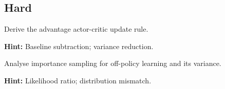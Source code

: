 \subsection*{Hard}

\begin{problem}
Derive the advantage actor-critic update rule.

\textbf{Hint:} Baseline subtraction; variance reduction.
\end{problem}

\begin{problem}
Analyse importance sampling for off-policy learning and its variance.

\textbf{Hint:} Likelihood ratio; distribution mismatch.
\end{problem}

